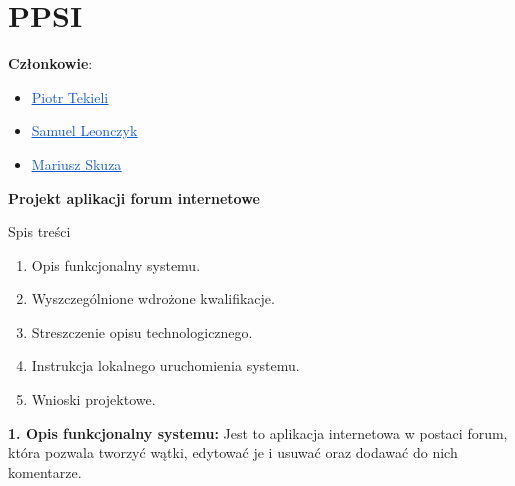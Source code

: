\documentclass[12pt]{article}
\renewcommand{\_}{\kern-1.5pt\textunderscore\kern-1.5pt}
\begin{document}
\section*{PPSI}
\setlength{\parskip}{12.0pt}
\textbf{Członkowie}:
\setlength{\parskip}{0.0pt}
\begin{itemize}
	\item \href{https://github.com/PiotrTekieli}{\textcolor[HTML]{1155CC}{\ul{Piotr Tekieli}}}\  
	\item \href{https://github.com/sam21401}{\textcolor[HTML]{1155CC}{\ul{Samuel Leonczyk}}}\  
\setlength{\parskip}{12.0pt}
	\item \href{https://github.com/Prestionyk}{\textcolor[HTML]{1155CC}{\ul{Mariusz Skuza}}}\  
\end{itemize}

\vspace{\baselineskip}
{\fontsize{18pt}{21.6pt}\selectfont \textbf{Projekt aplikacji forum internetowe}}

\vspace{\baselineskip}
Spis treści
\setlength{\parskip}{0.0pt}
\begin{enumerate}
	\item Opis funkcjonalny systemu.
	\item Wyszczególnione wdrożone kwalifikacje.
	\item Streszczenie opisu technologicznego.
	\item Instrukcja lokalnego uruchomienia systemu.
\setlength{\parskip}{12.0pt}
	\item Wnioski projektowe.
\end{enumerate}
\textbf{1. Opis funkcjonalny systemu:} 
Jest to aplikacja internetowa w postaci forum, która pozwala tworzyć wątki, edytować je i usuwać oraz dodawać do nich komentarze.
\end{document}
